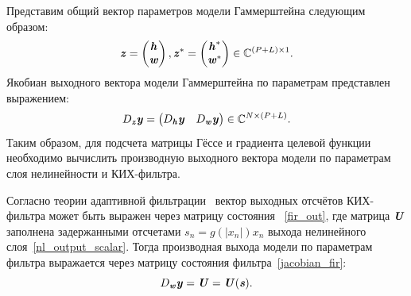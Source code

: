 Представим общий вектор параметров модели Гаммерштейна следующим образом:
\begin{equation}
	\textbf{\textit{z}}=\begin{pmatrix}
		\textbf{\textit{h}} \\ \textbf{\textit{w}}
	\end{pmatrix},
	\textbf{\textit{z}}^*=\begin{pmatrix}
		\textbf{\textit{h}}^* \\ \textbf{\textit{w}}^*
	\end{pmatrix}
	\in\mathbb{C}^{(P+L)\times 1}.
	\label{hammerst_full_param_vect}
\end{equation}
Якобиан выходного вектора модели Гаммерштейна по параметрам представлен выражением:
\begin{equation}
	D_{\textbf{\textit{z}}}\textbf{\textit{y}}=\begin{pmatrix}
		D_{\textbf{\textit{h}}}\textbf{\textit{y}} & D_{\textbf{\textit{w}}}\textbf{\textit{y}}
	\end{pmatrix}
	\in\mathbb{C}^{N\times(P+L)}.
	\label{hammerst_jacobian_full_general}
\end{equation}
Таким образом, для подсчета матрицы Гёссе и градиента целевой функции необходимо вычислить производную выходного вектора модели по параметрам слоя нелинейности и КИХ-фильтра.

Согласно теории адаптивной фильтрации~\cite{haykin} вектор выходных отсчётов КИХ-фильтра может быть выражен через матрицу состояния ~\eqref{fir_out}, где матрица $\textbf{\textit{U}}$ заполнена задержанными отсчетами $s_n=g(|x_n|)x_n$ выхода нелинейного слоя~\eqref{nl_output_scalar}. Тогда производная выхода модели по параметрам фильтра выражается через матрицу состояния фильтра~\eqref{jacobian_fir}:
\begin{equation}
	D_{\textbf{\textit{w}}}\textbf{\textit{y}}=\textbf{\textit{U}}=\textbf{\textit{U}}(\textbf{\textit{s}}).
	\label{hammerst_jac_fir}
\end{equation}

